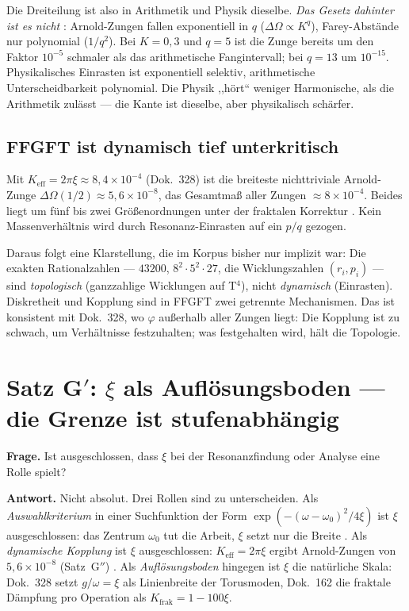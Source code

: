 Die Dreiteilung ist also in Arithmetik und Physik dieselbe. \emph{Das Gesetz
dahinter ist es nicht} \BM: Arnold-Zungen fallen exponentiell in $q$
($\Delta\Omega \propto K^q$), Farey-Abstände nur polynomial ($1/q^2$). Bei
$K = 0{,}3$ und $q = 5$ ist die Zunge bereits um den Faktor $10^{-5}$ schmaler
als das arithmetische Fangintervall; bei $q = 13$ um $10^{-15}$. Physikalisches
Einrasten ist exponentiell selektiv, arithmetische Unterscheidbarkeit
polynomial. Die Physik ,,hört`` weniger Harmonische, als die Arithmetik
zulässt --- die Kante ist dieselbe, aber physikalisch schärfer.

\subsection{FFGFT ist dynamisch tief unterkritisch}

Mit $K_\mathrm{eff} = 2\pi\xi \approx 8{,}4 \times 10^{-4}$ (Dok.~328) ist die
breiteste nichttriviale Arnold-Zunge $\Delta\Omega(1/2) \approx 5{,}6 \times
10^{-8}$, das Gesamtmaß aller Zungen $\approx 8 \times 10^{-4}$. Beides liegt
um fünf bis zwei Größenordnungen unter der fraktalen Korrektur \BM. Kein
Massenverhältnis wird durch Resonanz-Einrasten auf ein $p/q$ gezogen.

Daraus folgt eine Klarstellung, die im Korpus bisher nur implizit war: Die
exakten Rationalzahlen --- $43200$, $8^2 \cdot 5^2 \cdot 27$, die
Wicklungszahlen $(r_i, p_i)$ --- sind \emph{topologisch} (ganzzahlige
Wicklungen auf T$^4$), nicht \emph{dynamisch} (Einrasten). Diskretheit und
Kopplung sind in FFGFT zwei getrennte Mechanismen. Das ist konsistent mit
Dok.~328, wo $\varphi$ außerhalb aller Zungen liegt: Die Kopplung ist zu
schwach, um Verhältnisse festzuhalten; was festgehalten wird, hält die
Topologie.

\section{Satz G$'$: $\xi$ als Auflösungsboden --- die Grenze ist stufenabhängig}

\textbf{Frage.} Ist ausgeschlossen, dass $\xi$ bei der Resonanzfindung oder
Analyse eine Rolle spielt?

\textbf{Antwort.} Nicht absolut. Drei Rollen sind zu unterscheiden. Als
\emph{Auswahlkriterium} in einer Suchfunktion der Form
$\exp(-(\omega-\omega_0)^2/4\xi)$ ist $\xi$ ausgeschlossen: das Zentrum
$\omega_0$ tut die Arbeit, $\xi$ setzt nur die Breite \BM. Als
\emph{dynamische Kopplung} ist $\xi$ ausgeschlossen: $K_\mathrm{eff}=2\pi\xi$
ergibt Arnold-Zungen von $5{,}6\times10^{-8}$ (Satz~G$''$) \BM. Als
\emph{Auflösungsboden} hingegen ist $\xi$ die natürliche Skala: Dok.~328 setzt
$g/\omega = \xi$ als Linienbreite der Torusmoden, Dok.~162 die fraktale
Dämpfung pro Operation als $K_\mathrm{frak} = 1 - 100\xi$.

